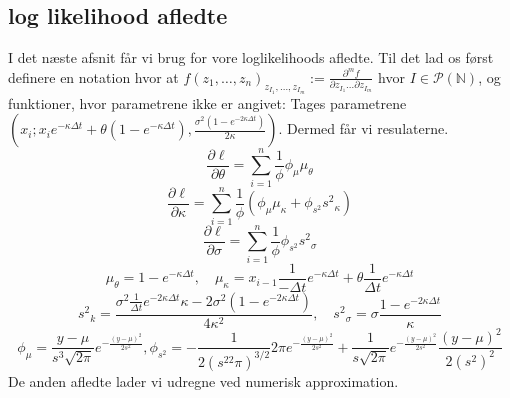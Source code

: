 \documentclass{article}
\theoremstyle{definition}
\theoremstyle{remark}
\begin{document}
\subsection{log likelihood afledte}
I det næste afsnit får vi brug for vore loglikelihoods afledte. Til det lad os først definere en notation hvor at $f(z_1,\hdots,z_n)_{z_{I_1},\hdots,z_{I_m}}:=\frac{\partial^m f}{\partial z_{I_1}\hdots\partial z_{I_m}}$ hvor $I\in \mathcal P(\mathbb N)$, og funktioner, hvor parametrene ikke er angivet: Tages parametrene $(x_i;x_ie^{-\kappa\Delta t}+\theta(1-e^{-\kappa\Delta t}),\frac{\sigma^2(1-e^{-2\kappa\Delta t})}{2\kappa})$. Dermed får vi resulaterne.
$$\frac{\partial \ell}{\partial \theta}=\sum_{i=1}^n\frac{1}{\phi}\phi_\mu\mu_\theta$$
$$\frac{\partial \ell}{\partial \kappa}=\sum_{i=1}^n\frac1{\phi}(\phi_\mu\mu_\kappa+\phi_{s^2}{s^2}_\kappa)$$
$$\frac{\partial \ell}{\partial \sigma}=\sum_{i=1}^n\frac1{\phi}\phi_{s^2}{s^2}_\sigma$$
$$\mu_\theta = 1-e^{-\kappa\Delta t},\quad \mu_\kappa = x_{i-1}\frac{1}{-\Delta t}e^{-\kappa\Delta t}+\theta\frac{1}{\Delta t}e^{-\kappa\Delta t}$$
$${s^2}_k= \frac{\sigma^2\frac{1}{\Delta t}e^{-2\kappa\Delta t}\kappa-2\sigma^2(1-e^{-2\kappa\Delta t})}{4\kappa^2},\quad {s^2}_\sigma=\sigma\frac{1-e^{-2\kappa\Delta t}}{\kappa}$$
$$\phi_\mu=\frac{y-\mu}{s^3\sqrt{2\pi}}e^{-\frac{(y-\mu)^2}{2s^2}},\phi_{s^2}=-\frac{1}{2(s^22\pi)^{3/2}}2\pi e^{-\frac{(y-\mu)^2}{2s^2}}+\frac{1}{s\sqrt{2\pi}}e^{-\frac{(y-\mu)^2}{2s^2}}\frac{(y-\mu)^2}{2(s^2)^2}$$
De anden afledte lader vi udregne ved numerisk approximation.


\end{document}
